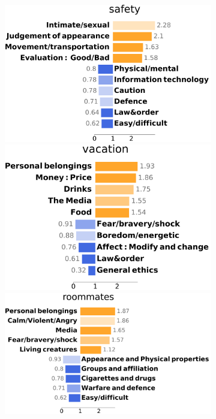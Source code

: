 \documentclass[letterpaper]{article} %
\begin{document}
\begin{figure}[!htb]
\begin{subfigure}[b]{\textwidth}
    \smallskip
    \includegraphics[scale=0.13]{figs/safety.pdf} 
    \includegraphics[scale=0.13]{figs/vacation.pdf} 
    \includegraphics[scale=0.13]{figs/roommates.pdf} 

\end{subfigure}
\end{figure}
\end{document}
